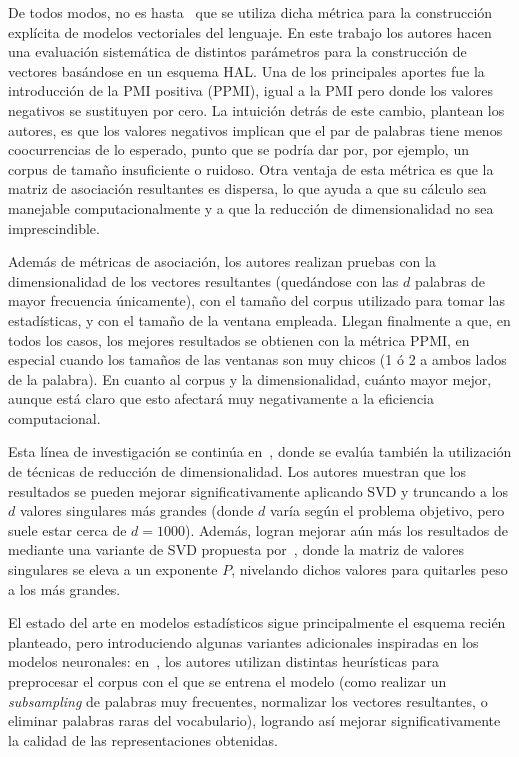 De todos modos, no es hasta~\cite{BullinariaLevy2007} que se utiliza dicha métrica para la
construcción explícita de modelos vectoriales del lenguaje. En este trabajo los autores hacen una
evaluación sistemática de distintos parámetros para la construcción de vectores basándose en un
esquema HAL\@. Una de los principales aportes fue la introducción de la PMI positiva (PPMI), igual a
la PMI pero donde los valores negativos se sustituyen por cero. La intuición detrás de este cambio,
plantean los autores, es que los valores negativos implican que el par de palabras tiene menos
coocurrencias de lo esperado, punto que se podría dar por, por ejemplo, un corpus de tamaño
insuficiente o ruidoso. Otra ventaja de esta métrica es que la matriz de asociación resultantes es
dispersa, lo que ayuda a que su cálculo sea manejable computacionalmente y a que la reducción de
dimensionalidad no sea imprescindible.

Además de métricas de asociación, los autores realizan pruebas con la dimensionalidad de los
vectores resultantes (quedándose con las $d$ palabras de mayor frecuencia únicamente), con el tamaño
del corpus utilizado para tomar las estadísticas, y con el tamaño de la ventana empleada. Llegan
finalmente a que, en todos los casos, los mejores resultados se obtienen con la métrica PPMI, en
especial cuando los tamaños de las ventanas son muy chicos (1 ó 2 a ambos lados de la palabra). En
cuanto al corpus y la dimensionalidad, cuánto mayor mejor, aunque está claro que esto afectará muy
negativamente a la eficiencia computacional.

Esta línea de investigación se continúa en~\cite{BullinariaLevy2012}, donde se evalúa también la
utilización de técnicas de reducción de dimensionalidad. Los autores muestran que los resultados se
pueden mejorar significativamente aplicando SVD y truncando a los $d$ valores singulares más grandes
(donde $d$ varía según el problema objetivo, pero suele estar cerca de $d = 1000$).  Además, logran
mejorar aún más los resultados de mediante una variante de SVD propuesta por~\cite{Caron2001}, donde
la matriz de valores singulares se eleva a un exponente $P$, nivelando dichos valores para quitarles
peso a los más grandes.


El estado del arte en modelos estadísticos sigue principalmente el esquema recién planteado, pero
introduciendo algunas variantes adicionales inspiradas en los modelos neuronales:
en~\cite{Levy2015}, los autores utilizan distintas heurísticas para preprocesar el corpus con el que
se entrena el modelo (como realizar un \textit{subsampling} de palabras muy frecuentes, normalizar
los vectores resultantes, o eliminar palabras raras del vocabulario), logrando así mejorar
significativamente la calidad de las representaciones obtenidas.


